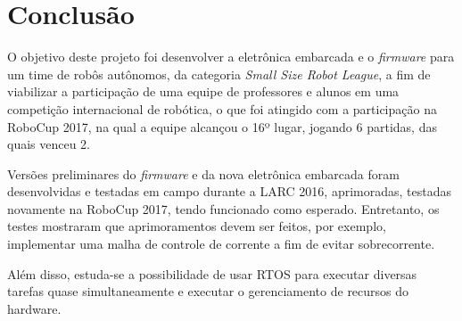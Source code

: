 \chapter{Conclusão}\label{cap:conclusao}

%
%
%
%


O objetivo deste projeto foi desenvolver a eletrônica embarcada e o \textit{firmware} para um time de robôs autônomos, da categoria \textit{Small Size Robot League}, a fim de viabilizar a participação de uma equipe de professores e alunos em uma competição internacional de robótica, o que foi atingido com a participação na RoboCup 2017, na qual a equipe alcançou o 16º lugar, jogando 6 partidas, das quais venceu 2.

Versões preliminares do \textit{firmware} e da nova eletrônica embarcada foram desenvolvidas e testadas em campo durante a LARC 2016, aprimoradas, testadas novamente na RoboCup 2017, tendo funcionado como esperado. Entretanto, os testes mostraram que aprimoramentos devem ser feitos, por exemplo, implementar uma malha de controle de corrente a fim de evitar sobrecorrente.

Além disso, estuda-se a possibilidade de usar RTOS para executar diversas tarefas quase simultaneamente e executar o gerenciamento de recursos do hardware. 

